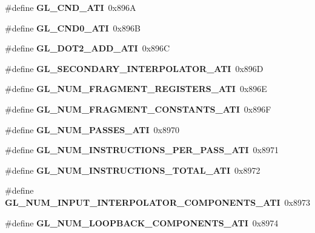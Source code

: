 \begin{DoxyCompactItemize}
\item 
\#define {\bfseries G\+L\+\_\+\+C\+N\+D\+\_\+\+A\+T\+I}~0x896\+A\label{_s_d_l__opengl_8h_a161a35ed7e6beea58db44c54c6d9f06b}

\item 
\#define {\bfseries G\+L\+\_\+\+C\+N\+D0\+\_\+\+A\+T\+I}~0x896\+B\label{_s_d_l__opengl_8h_a84c43b2f8917e365271277d06ff6d24b}

\item 
\#define {\bfseries G\+L\+\_\+\+D\+O\+T2\+\_\+\+A\+D\+D\+\_\+\+A\+T\+I}~0x896\+C\label{_s_d_l__opengl_8h_ae9c506d55f6a65eff2db79874c607f1f}

\item 
\#define {\bfseries G\+L\+\_\+\+S\+E\+C\+O\+N\+D\+A\+R\+Y\+\_\+\+I\+N\+T\+E\+R\+P\+O\+L\+A\+T\+O\+R\+\_\+\+A\+T\+I}~0x896\+D\label{_s_d_l__opengl_8h_a8eebb92367d671ecb0b434cc83fa4553}

\item 
\#define {\bfseries G\+L\+\_\+\+N\+U\+M\+\_\+\+F\+R\+A\+G\+M\+E\+N\+T\+\_\+\+R\+E\+G\+I\+S\+T\+E\+R\+S\+\_\+\+A\+T\+I}~0x896\+E\label{_s_d_l__opengl_8h_a9a6f7865decb38d77c83555736f92212}

\item 
\#define {\bfseries G\+L\+\_\+\+N\+U\+M\+\_\+\+F\+R\+A\+G\+M\+E\+N\+T\+\_\+\+C\+O\+N\+S\+T\+A\+N\+T\+S\+\_\+\+A\+T\+I}~0x896\+F\label{_s_d_l__opengl_8h_a175f4de270045a93f929b7441b6245b2}

\item 
\#define {\bfseries G\+L\+\_\+\+N\+U\+M\+\_\+\+P\+A\+S\+S\+E\+S\+\_\+\+A\+T\+I}~0x8970\label{_s_d_l__opengl_8h_af026b485d7b4110f7ce152362d475598}

\item 
\#define {\bfseries G\+L\+\_\+\+N\+U\+M\+\_\+\+I\+N\+S\+T\+R\+U\+C\+T\+I\+O\+N\+S\+\_\+\+P\+E\+R\+\_\+\+P\+A\+S\+S\+\_\+\+A\+T\+I}~0x8971\label{_s_d_l__opengl_8h_aa19b5c10f0044a3169db7b1ba582ea2f}

\item 
\#define {\bfseries G\+L\+\_\+\+N\+U\+M\+\_\+\+I\+N\+S\+T\+R\+U\+C\+T\+I\+O\+N\+S\+\_\+\+T\+O\+T\+A\+L\+\_\+\+A\+T\+I}~0x8972\label{_s_d_l__opengl_8h_a81c6a72de23ef8be4e09b6c74bd02187}

\item 
\#define {\bfseries G\+L\+\_\+\+N\+U\+M\+\_\+\+I\+N\+P\+U\+T\+\_\+\+I\+N\+T\+E\+R\+P\+O\+L\+A\+T\+O\+R\+\_\+\+C\+O\+M\+P\+O\+N\+E\+N\+T\+S\+\_\+\+A\+T\+I}~0x8973\label{_s_d_l__opengl_8h_a87ff5db99f49bf47baa55dc2f68e9a61}

\item 
\#define {\bfseries G\+L\+\_\+\+N\+U\+M\+\_\+\+L\+O\+O\+P\+B\+A\+C\+K\+\_\+\+C\+O\+M\+P\+O\+N\+E\+N\+T\+S\+\_\+\+A\+T\+I}~0x8974\label{_s_d_l__opengl_8h_a6f9b02610f3280ac1c1d9bf59b97796d}


\end{DoxyCompactItemize}

